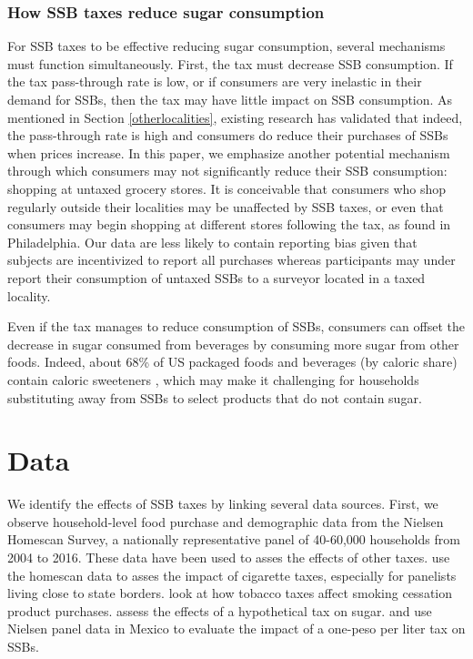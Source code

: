 \documentclass[12pt]{article}
\begin{document}
\subsubsection{How SSB taxes reduce sugar consumption}

For SSB taxes to be effective reducing sugar consumption, several mechanisms must function simultaneously. First, the tax must decrease SSB consumption. If the tax pass-through rate is low, or if consumers are very inelastic in their demand for SSBs, then the tax may have little impact on SSB consumption. As mentioned in Section \ref{otherlocalities}, existing research has validated that indeed, the pass-through rate is high and consumers do reduce their purchases of SSBs when prices increase. In this paper, we emphasize another potential mechanism through which consumers may not significantly reduce their SSB consumption: shopping at untaxed grocery stores. It is conceivable that consumers who shop regularly outside their localities may be unaffected by SSB taxes, or even that consumers may begin shopping at different stores following the tax, as \textcite{cawley2020philly} found in Philadelphia. Our data are less likely to contain reporting bias given that subjects are incentivized to report all purchases whereas participants may under report their consumption of untaxed SSBs to a surveyor located in a taxed locality.

Even if the tax manages to reduce consumption of SSBs, consumers can offset the decrease in sugar consumed from beverages by consuming more sugar from other foods. Indeed, about 68\% of US packaged foods and beverages (by caloric share) contain caloric sweeteners \parencite{popkin2016sweetening}, which may make it challenging for households substituting away from SSBs to select products that do not contain sugar.

\section{Data} \label{data}

We identify the effects of SSB taxes by linking several data sources. First, we observe household-level food purchase and demographic data from the Nielsen Homescan Survey, a nationally representative panel of 40-60,000 households from 2004 to 2016. These data have been used to asses the effects of other taxes. \textcite{harding2012heterogeneous} use the homescan data to asses the impact of cigarette taxes, especially for panelists living close to state borders. \textcite{cotti2016effects} look at how tobacco taxes affect smoking cessation product purchases. \textcite{dharmasena2012intended} assess the effects of a hypothetical tax on sugar. \textcite{colchero2016beverage} and \textcite{colchero2017mexico} use Nielsen panel data in Mexico to evaluate the impact of a one-peso per liter tax on SSBs.
\end{document}
